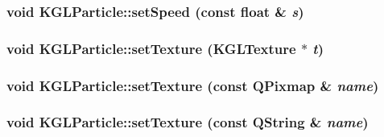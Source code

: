 \hypertarget{class_k_g_l_particle_4d17097516ffa4248e359c14e3b8d3dc}{
\subsubsection[{setSpeed}]{\setlength{\rightskip}{0pt plus 5cm}void KGLParticle::setSpeed (const float \& {\em s})}}
\label{class_k_g_l_particle_4d17097516ffa4248e359c14e3b8d3dc}


\hypertarget{class_k_g_l_particle_02f5c7f2b11ac94573570af130d0fe33}{
\subsubsection[{setTexture}]{\setlength{\rightskip}{0pt plus 5cm}void KGLParticle::setTexture ({\bf KGLTexture} $\ast$ {\em t})}}
\label{class_k_g_l_particle_02f5c7f2b11ac94573570af130d0fe33}


\hypertarget{class_k_g_l_particle_ff9e1c4f5c6d3a8a26f1a30e59a0e48b}{
\subsubsection[{setTexture}]{\setlength{\rightskip}{0pt plus 5cm}void KGLParticle::setTexture (const QPixmap \& {\em name})}}
\label{class_k_g_l_particle_ff9e1c4f5c6d3a8a26f1a30e59a0e48b}


\hypertarget{class_k_g_l_particle_47978679ec7686a3031bc429eb3079b7}{
\subsubsection[{setTexture}]{\setlength{\rightskip}{0pt plus 5cm}void KGLParticle::setTexture (const QString \& {\em name})}}
\label{class_k_g_l_particle_47978679ec7686a3031bc429eb3079b7}


